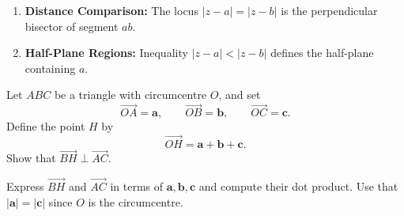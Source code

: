 \begin{takeaways}
\begin{enumerate}
    \item \textbf{Distance Comparison:} The locus $|z-a| = |z-b|$ is the perpendicular bisector of segment $ab$.
    \item \textbf{Half-Plane Regions:} Inequality $|z-a| < |z-b|$ defines the half-plane containing $a$.
\end{enumerate}
\end{takeaways}

\begin{problem}
Let $ABC$ be a triangle with circumcentre $O$, and set
\[\vec{OA}=\mathbf{a},\qquad \vec{OB}=\mathbf{b},\qquad \vec{OC}=\mathbf{c}.
\]
Define the point $H$ by
\[\vec{OH}=\mathbf{a}+\mathbf{b}+\mathbf{c}.
\]
Show that $\vec{BH}\perp\vec{AC}$.
\end{problem}

\begin{hint}
Express $\vec{BH}$ and $\vec{AC}$ in terms of $\mathbf{a},\mathbf{b},\mathbf{c}$ and compute their dot product. Use that $|\mathbf{a}|=|\mathbf{c}|$ since $O$ is the circumcentre.
\end{hint}

